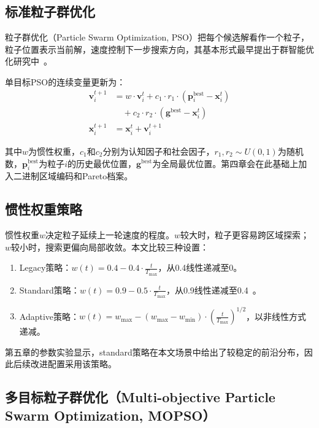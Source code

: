 \subsection{标准粒子群优化}

粒子群优化（Particle Swarm Optimization, PSO）把每个候选解看作一个粒子，粒子位置表示当前解，速度控制下一步搜索方向，其基本形式最早提出于群智能优化研究中~\cite{Kennedy1995}。

单目标PSO的连续变量更新为：
\vspace{-0.5\baselineskip}
\begin{align}
\mathbf{v}_i^{t+1}
&= w \cdot \mathbf{v}_i^t
 + c_1 \cdot r_1 \cdot (\mathbf{p}_i^{\text{best}} - \mathbf{x}_i^t) \nonumber\\
&\quad + c_2 \cdot r_2 \cdot (\mathbf{g}^{\text{best}} - \mathbf{x}_i^t) \label{eq:pso_velocity} \\
\mathbf{x}_i^{t+1}
&= \mathbf{x}_i^t + \mathbf{v}_i^{t+1} \label{eq:pso_position}
\end{align}
\vspace{-1.5\baselineskip}

\noindent{}其中$w$为惯性权重，$c_1$和$c_2$分别为认知因子和社会因子，$r_1,r_2\sim U(0,1)$为随机数，$\mathbf{p}_i^{\text{best}}$为粒子$i$的历史最优位置，$\mathbf{g}^{\text{best}}$为全局最优位置。第四章会在此基础上加入二进制区域编码和Pareto档案。

\subsection{惯性权重策略}

惯性权重$w$决定粒子延续上一轮速度的程度。$w$较大时，粒子更容易跨区域探索；$w$较小时，搜索更偏向局部收敛。本文比较三种设置：

\begin{enumerate}
    \item Legacy策略：$w(t) = 0.4 - 0.4 \cdot \frac{t}{T_{\max}}$，从0.4线性递减至0。
    \item Standard策略：$w(t) = 0.9 - 0.5 \cdot \frac{t}{T_{\max}}$，从0.9线性递减至0.4~\cite{Shi1998}。
    \item Adaptive策略：$w(t) = w_{\max} - (w_{\max} - w_{\min}) \cdot \left(\frac{t}{T_{\max}}\right)^{1/2}$，以非线性方式递减。
\end{enumerate}

第五章的参数实验显示，standard策略在本文场景中给出了较稳定的前沿分布，因此后续改进配置采用该策略。

\subsection{多目标粒子群优化（Multi-objective Particle Swarm Optimization, MOPSO）}

